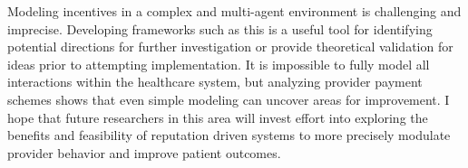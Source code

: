 \documentclass{article}
\begin{document}
Modeling incentives in a complex and multi-agent environment is challenging and imprecise. Developing frameworks such as this is a useful tool for identifying potential directions for further investigation or provide theoretical validation for ideas prior to attempting implementation. It is impossible to fully model all interactions within the healthcare system, but analyzing provider payment schemes shows that even simple modeling can uncover areas for improvement. I hope that future researchers in this area will invest effort into exploring the benefits and feasibility of reputation driven systems to more precisely modulate provider behavior and improve patient outcomes.



\clearpage
\end{document}
